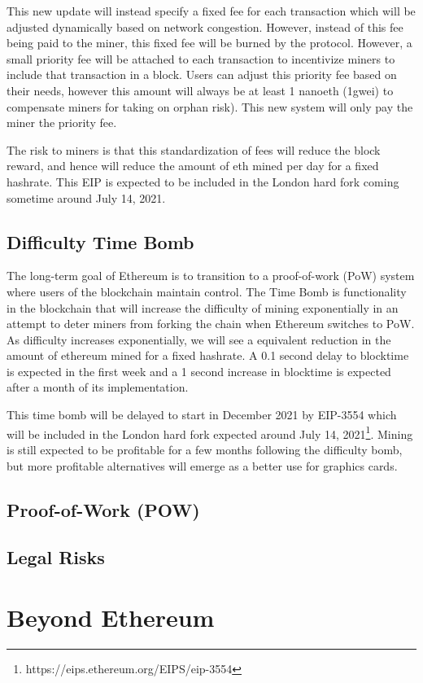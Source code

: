 \documentclass[a4paper,11pt]{article}
\begin{document}
This new update will instead specify a fixed fee for each transaction which will be adjusted dynamically based on network congestion. However, instead of this fee being paid to the miner, this fixed fee will be burned by the protocol. However, a small priority fee will be attached to each transaction to incentivize miners to include that transaction in a block. Users can adjust this priority fee based on their needs, however this amount will always be at least 1 nanoeth (1gwei) to compensate miners for taking on orphan risk). This new system will only pay the miner the priority fee. 

The risk to miners is that this standardization of fees will reduce the block reward, and hence will reduce the amount of eth mined per day for a fixed hashrate. This EIP is expected to be included in the London hard fork coming sometime around July 14, 2021.
\vspace{-10pt}
\subsection{Difficulty Time Bomb}
\vspace{-10pt}
The long-term goal of Ethereum is to transition to a proof-of-work (PoW) system where users of the blockchain maintain control. The Time Bomb is functionality in the blockchain that will increase the difficulty of mining exponentially in an attempt to deter miners from forking the chain when Ethereum switches to PoW. As difficulty increases exponentially, we will see a equivalent reduction in the amount of ethereum mined for a fixed hashrate. A 0.1 second delay to blocktime is expected in the first week and a 1 second increase in blocktime is expected after a month of its implementation.

This time bomb will be delayed to start in December 2021 by EIP-3554 which will be included in the London hard fork expected around July 14, 2021\footnote{https://eips.ethereum.org/EIPS/eip-3554}. Mining is still expected to be profitable for a few months following the difficulty bomb, but more profitable alternatives will emerge as a better use for graphics cards.
\vspace{-10pt}
\subsection{Proof-of-Work (POW)}
\vspace{-10pt}

\vspace{-10pt}
\subsection{Legal Risks}

\section{Beyond Ethereum}
\end{document}
